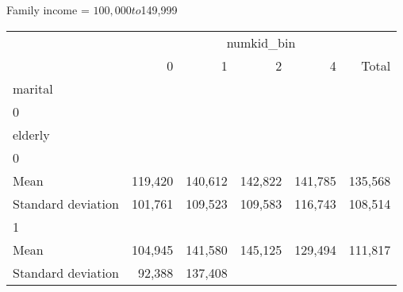 Family income = $100,000 to $149,999
\begin{tabular}{llllll}
\cline{1-6}
\multicolumn{1}{c}{} &
  \multicolumn{5}{|c}{numkid\_bin} \\
\multicolumn{1}{c}{} &
  \multicolumn{1}{|r}{0} &
  \multicolumn{1}{r}{1} &
  \multicolumn{1}{r}{2} &
  \multicolumn{1}{r}{4} &
  \multicolumn{1}{r}{Total} \\
\cline{1-6}
\multicolumn{1}{l}{marital} &
  \multicolumn{1}{|r}{} &
  \multicolumn{1}{r}{} &
  \multicolumn{1}{r}{} &
  \multicolumn{1}{r}{} &
  \multicolumn{1}{r}{} \\
\multicolumn{1}{l}{\hspace{1em}0} &
  \multicolumn{1}{|r}{} &
  \multicolumn{1}{r}{} &
  \multicolumn{1}{r}{} &
  \multicolumn{1}{r}{} &
  \multicolumn{1}{r}{} \\
\multicolumn{1}{l}{\hspace{2em}elderly} &
  \multicolumn{1}{|r}{} &
  \multicolumn{1}{r}{} &
  \multicolumn{1}{r}{} &
  \multicolumn{1}{r}{} &
  \multicolumn{1}{r}{} \\
\multicolumn{1}{l}{\hspace{3em}0} &
  \multicolumn{1}{|r}{} &
  \multicolumn{1}{r}{} &
  \multicolumn{1}{r}{} &
  \multicolumn{1}{r}{} &
  \multicolumn{1}{r}{} \\
\multicolumn{1}{l}{\hspace{4em}Mean} &
  \multicolumn{1}{|r}{119,420} &
  \multicolumn{1}{r}{140,612} &
  \multicolumn{1}{r}{142,822} &
  \multicolumn{1}{r}{141,785} &
  \multicolumn{1}{r}{135,568} \\
\multicolumn{1}{l}{\hspace{4em}Standard deviation} &
  \multicolumn{1}{|r}{101,761} &
  \multicolumn{1}{r}{109,523} &
  \multicolumn{1}{r}{109,583} &
  \multicolumn{1}{r}{116,743} &
  \multicolumn{1}{r}{108,514} \\
\multicolumn{1}{l}{\hspace{3em}1} &
  \multicolumn{1}{|r}{} &
  \multicolumn{1}{r}{} &
  \multicolumn{1}{r}{} &
  \multicolumn{1}{r}{} &
  \multicolumn{1}{r}{} \\
\multicolumn{1}{l}{\hspace{4em}Mean} &
  \multicolumn{1}{|r}{104,945} &
  \multicolumn{1}{r}{141,580} &
  \multicolumn{1}{r}{145,125} &
  \multicolumn{1}{r}{129,494} &
  \multicolumn{1}{r}{111,817} \\
\multicolumn{1}{l}{\hspace{4em}Standard deviation} &
  \multicolumn{1}{|r}{92,388} &
  \multicolumn{1}{r}{137,408} &

\end{tabular}
